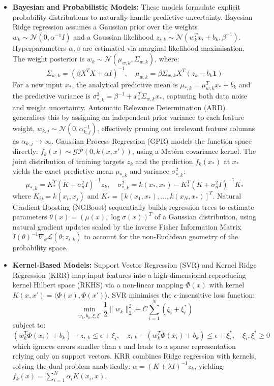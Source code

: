 \documentclass[12pt]{article}
\begin{document}
\begin{itemize}
\item \textbf{Bayesian and Probabilistic Models:} These models formulate explicit probability distributions to naturally handle predictive uncertainty. Bayesian Ridge regression assumes a Gaussian prior over the weights $w_k \sim \mathcal{N}(0, \alpha^{-1} I)$ and a Gaussian likelihood $z_{i,k} \sim \mathcal{N}(w_k^T x_i + b_k, \beta^{-1})$. Hyperparameters $\alpha, \beta$ are estimated via marginal likelihood maximisation. The weight posterior is $w_k \sim \mathcal{N}(\mu_{w,k}, \Sigma_{w,k})$, where:
\[
\Sigma_{w,k} = \left(\beta X^T X + \alpha I\right)^{-1}, \quad \mu_{w,k} = \beta \Sigma_{w,k} X^T (z_k - b_k \mathbf{1})
\]
For a new input $x_*$, the analytical predictive mean is $\mu_{*,k} = \mu_{w,k}^T x_* + b_k$ and the predictive variance is $\sigma_{*,k}^2 = \beta^{-1} + x_*^T \Sigma_{w,k} x_*$, capturing both data noise and weight uncertainty.
Automatic Relevance Determination (ARD) generalises this by assigning an independent prior variance to each feature weight, $w_{k,j} \sim \mathcal{N}(0, \alpha_{k,j}^{-1})$, effectively pruning out irrelevant feature columns as $\alpha_{k,j} \to \infty$. Gaussian Process Regression (GPR) models the function space directly: $f_k(x) \sim \mathcal{GP}(0, k(x, x'))$, using a Mat\'{e}rn covariance kernel. The joint distribution of training targets $z_k$ and the prediction $f_k(x_*)$ at $x_*$ yields the exact predictive mean $\mu_{*,k}$ and variance $\sigma_{*,k}^2$:
\[
\mu_{*,k} = K_*^T \left(K + \sigma_n^2 I\right)^{-1} z_k, \quad \sigma_{*,k}^2 = k(x_*, x_*) - K_*^T \left(K + \sigma_n^2 I\right)^{-1} K_*
\]
where $K_{ij} = k(x_i, x_j)$ and $K_* = [k(x_1, x_*), \dots, k(x_N, x_*)]^T$. Natural Gradient Boosting (NGBoost) sequentially builds regression trees to estimate parameters $\theta(x) = (\mu(x), \log\sigma(x))^T$ of a Gaussian distribution, using natural gradient updates scaled by the inverse Fisher Information Matrix $I(\theta)^{-1} \nabla_\theta \mathcal{L}(\theta; z_{i,k})$ to account for the non-Euclidean geometry of the probability space.

\item \textbf{Kernel-Based Models:} Support Vector Regression (SVR) and Kernel Ridge Regression (KRR) map input features into a high-dimensional reproducing kernel Hilbert space (RKHS) via a non-linear mapping $\Phi(x)$ with kernel $K(x, x') = \langle \Phi(x), \Phi(x') \rangle$. SVR minimises the $\epsilon$-insensitive loss function:
\[
\min_{w_k,b_k,\xi,\xi^*} \frac{1}{2} \|w_k\|_2^2 + C \sum_{i=1}^N \left(\xi_i + \xi_i^*\right)
\]
subject to:
\[
(w_k^T \Phi(x_i) + b_k) - z_{i,k} \leq \epsilon + \xi_i, \quad z_{i,k} - (w_k^T \Phi(x_i) + b_k) \leq \epsilon + \xi_i^*, \quad \xi_i, \xi_i^* \geq 0
\]
which ignores errors smaller than $\epsilon$ and leads to a sparse representation relying only on support vectors. KRR combines Ridge regression with kernels, solving the dual problem analytically: $\alpha = (K + \lambda I)^{-1} z_k$, yielding $f_k(x) = \sum_{i=1}^N \alpha_i K(x_i, x)$.


\end{itemize}
\end{document}
